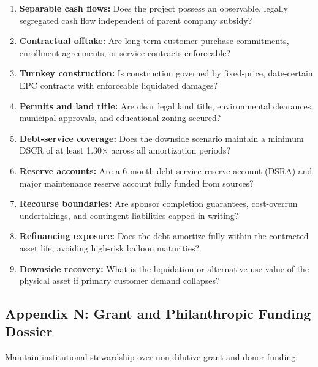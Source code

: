 \begin{enumerate}
    \item \textbf{Separable cash flows:} Does the project possess an observable, legally segregated cash flow independent of parent company subsidy?
    \item \textbf{Contractual offtake:} Are long-term customer purchase commitments, enrollment agreements, or service contracts enforceable?
    \item \textbf{Turnkey construction:} Is construction governed by fixed-price, date-certain EPC contracts with enforceable liquidated damages?
    \item \textbf{Permits and land title:} Are clear legal land title, environmental clearances, municipal approvals, and educational zoning secured?
    \item \textbf{Debt-service coverage:} Does the downside scenario maintain a minimum DSCR of at least 1.30$\times$ across all amortization periods?
    \item \textbf{Reserve accounts:} Are a 6-month debt service reserve account (DSRA) and major maintenance reserve account fully funded from sources?
    \item \textbf{Recourse boundaries:} Are sponsor completion guarantees, cost-overrun undertakings, and contingent liabilities capped in writing?
    \item \textbf{Refinancing exposure:} Does the debt amortize fully within the contracted asset life, avoiding high-risk balloon maturities?
    \item \textbf{Downside recovery:} What is the liquidation or alternative-use value of the physical asset if primary customer demand collapses?
\end{enumerate}

\subsection{Appendix N: Grant and Philanthropic Funding Dossier}

Maintain institutional stewardship over non-dilutive grant and donor funding:


